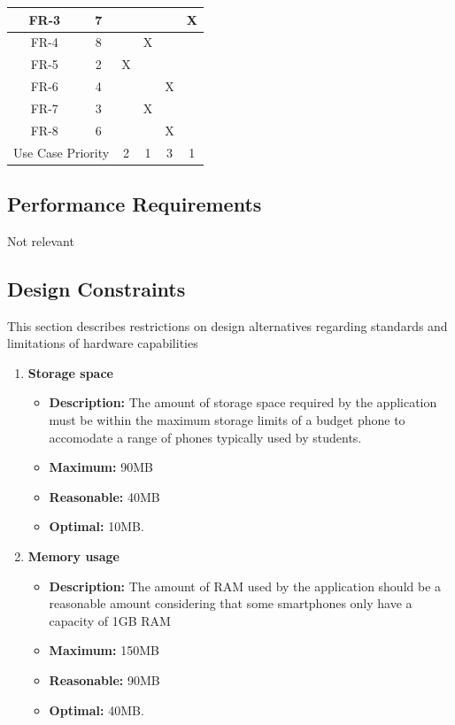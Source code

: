 \documentclass{article}
\begin{document}
\begin{enumerate}
\begin{table}[]
\begin{tabular}{cc|c|c|c|c|}
\multicolumn{1}{|c|}{FR-3}        & 7        &        &       &       & X     \\ \hline
\multicolumn{1}{|c|}{FR-4}        & 8        &        & X     &       &       \\ \hline
\multicolumn{1}{|c|}{FR-5}        & 2        & X      &       &       &       \\ \hline
\multicolumn{1}{|c|}{FR-6}        & 4        &        &       & X     &       \\ \hline
\multicolumn{1}{|c|}{FR-7}        & 3        &        & X     &       &       \\ \hline
\multicolumn{1}{|c|}{FR-8}        & 6        &        &       & X     &       \\ \hline
\multicolumn{2}{|c|}{Use Case Priority}      & 2      & 1     & 3     & 1     \\ \hline
\end{tabular}
\end{table}
	\end{enumerate}
	
	
	\subsection{Performance Requirements}
	Not relevant
	
	\subsection{Design Constraints}
	This section describes restrictions on design alternatives regarding standards and limitations of hardware capabilities
	\begin{enumerate}
		\item \textbf{Storage space}
		\begin{itemize}
			\item \textbf{Description:} The amount of storage space required by the application must be within the maximum storage limits of a budget phone to accomodate a range of phones typically used by students.
			\item \textbf{Maximum:} 90MB
			\item \textbf{Reasonable:} 40MB
			\item \textbf{Optimal:} 10MB.\newline
		\end{itemize}
	
		\item \textbf{Memory usage}
		\begin{itemize}
			\item \textbf{Description:} The amount of RAM used by the application should be a reasonable amount considering that some smartphones only have a capacity of 1GB RAM
			\item \textbf{Maximum:} 150MB
			\item \textbf{Reasonable:} 90MB
			\item \textbf{Optimal:} 40MB.\newline
		\end{itemize}
	\end{enumerate}
	
\end{document}

